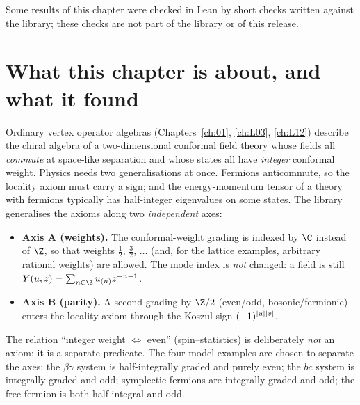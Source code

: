 Some results of this chapter were checked in Lean by short checks written against the library;
these checks are not part of the library or of this release.

\section{What this chapter is about, and what it found}\label{l17:sec:intro}

Ordinary vertex operator algebras (Chapters~\ref{ch:01}, \ref{ch:L03}, \ref{ch:L12}) describe the
chiral algebra of a two-dimensional conformal field theory whose fields all \emph{commute} at
space-like separation and whose states all have \emph{integer} conformal weight. Physics needs two
generalisations at once. Fermions anticommute, so the locality axiom must carry a sign; and the
energy-momentum tensor of a theory with fermions typically has half-integer eigenvalues on some
states. The library generalises the axioms along two \emph{independent} axes:

\begin{itemize}
\item \textbf{Axis A (weights).} The conformal-weight grading is indexed by $\C$ instead of $\Z$, so
  that weights $\tfrac12$, $\tfrac32$, $\dots$ (and, for the lattice examples, arbitrary rational
  weights) are allowed. The mode index is \emph{not} changed: a field is still
  $Y(u,z)=\sum_{n\in\Z}u_{(n)}z^{-n-1}$.
\item \textbf{Axis B (parity).} A second grading by $\Z/2$ (even/odd, bosonic/fermionic) enters the
  locality axiom through the Koszul sign $(-1)^{|u||v|}$.
\end{itemize}

The relation ``integer weight $\Leftrightarrow$ even'' (spin--statistics) is deliberately \emph{not}
an axiom; it is a separate predicate. The four model examples are chosen to separate the axes: the
$\beta\gamma$ system is half-integrally graded and purely even; the $bc$ system is integrally graded
and odd; symplectic fermions are integrally graded and odd; the free fermion is both half-integral
and odd.

